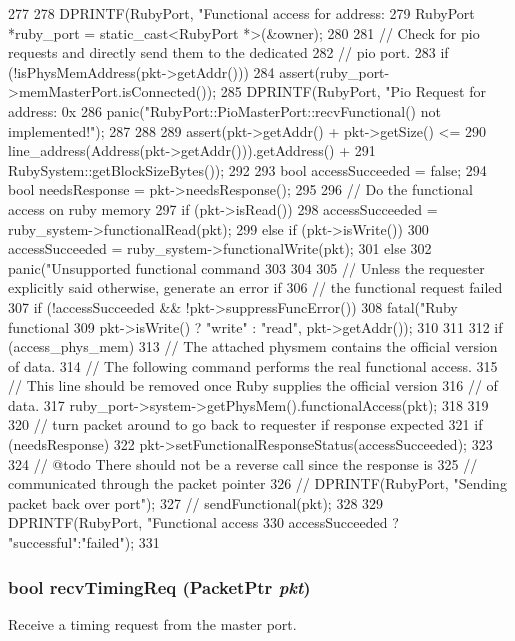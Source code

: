 \begin{DoxyCode}
277 {
278     DPRINTF(RubyPort, "Functional access for address: %
279     RubyPort *ruby_port = static_cast<RubyPort *>(&owner);
280 
281     // Check for pio requests and directly send them to the dedicated
282     // pio port.
283     if (!isPhysMemAddress(pkt->getAddr())) {
284         assert(ruby_port->memMasterPort.isConnected());
285         DPRINTF(RubyPort, "Pio Request for address: 0x%
286         panic("RubyPort::PioMasterPort::recvFunctional() not implemented!\n");
287     }
288 
289     assert(pkt->getAddr() + pkt->getSize() <=
290                 line_address(Address(pkt->getAddr())).getAddress() +
291                 RubySystem::getBlockSizeBytes());
292 
293     bool accessSucceeded = false;
294     bool needsResponse = pkt->needsResponse();
295 
296     // Do the functional access on ruby memory
297     if (pkt->isRead()) {
298         accessSucceeded = ruby_system->functionalRead(pkt);
299     } else if (pkt->isWrite()) {
300         accessSucceeded = ruby_system->functionalWrite(pkt);
301     } else {
302         panic("Unsupported functional command %
303     }
304 
305     // Unless the requester explicitly said otherwise, generate an error if
306     // the functional request failed
307     if (!accessSucceeded && !pkt->suppressFuncError()) {
308         fatal("Ruby functional %
309               pkt->isWrite() ? "write" : "read", pkt->getAddr());
310     }
311 
312     if (access_phys_mem) {
313         // The attached physmem contains the official version of data.
314         // The following command performs the real functional access.
315         // This line should be removed once Ruby supplies the official version
316         // of data.
317         ruby_port->system->getPhysMem().functionalAccess(pkt);
318     }
319 
320     // turn packet around to go back to requester if response expected
321     if (needsResponse) {
322         pkt->setFunctionalResponseStatus(accessSucceeded);
323 
324         // @todo There should not be a reverse call since the response is
325         // communicated through the packet pointer
326         // DPRINTF(RubyPort, "Sending packet back over port\n");
327         // sendFunctional(pkt);
328     }
329     DPRINTF(RubyPort, "Functional access %
330             accessSucceeded ? "successful":"failed");
331 }
\end{DoxyCode}
\hypertarget{classRubyPort_1_1MemSlavePort_a3344d9dd0f83257feab5424e761f31c6}{
\subsubsection[{recvTimingReq}]{\setlength{\rightskip}{0pt plus 5cm}bool recvTimingReq ({\bf PacketPtr} {\em pkt})}}
\label{classRubyPort_1_1MemSlavePort_a3344d9dd0f83257feab5424e761f31c6}
Receive a timing request from the master port. 

